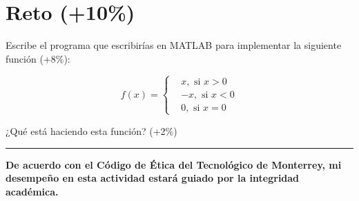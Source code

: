 \documentclass[11pt]{article}
\newcommand{\responserule}{{\large\rule{10 cm}{0.3mm}}}
\begin{document}


\section{Reto (+10\%)}

Escribe el programa que escribirías en MATLAB para implementar la siguiente función (+8\%):

$$f(x) = %
\begin{cases}
    &x, \text{ si } x > 0 \\
    & -x, \text{ si } x < 0 \\
    &0, \text{ si } x = 0
\end{cases}
$$

\vspace{2ex}

¿Qué está haciendo esta función? (+2\%) \responserule

\vfill

\textbf{De acuerdo con el Código de Ética del Tecnológico de Monterrey, mi desempeño en esta actividad estará guiado por la integridad académica.}
\end{document}
